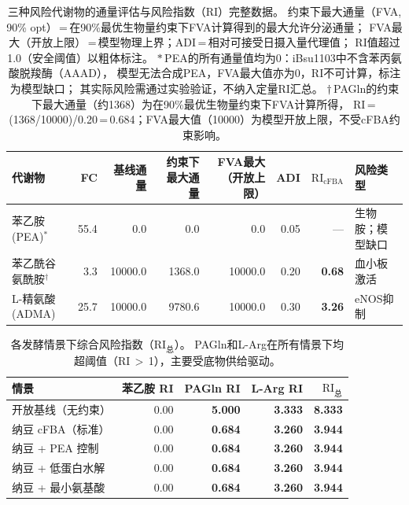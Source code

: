 \documentclass[10pt, a4paper, twocolumn]{ctexart}
\begin{document}
\begin{table}[htbp]
\caption{三种风险代谢物的通量评估与风险指数（RI）完整数据。
  约束下最大通量（FVA, 90\% opt）\,=\,在90\%最优生物量约束下FVA计算得到的最大允许分泌通量；
  FVA最大（开放上限）\,=\,模型物理上界；ADI\,=\,相对可接受日摄入量代理值；
  RI值超过1.0（安全阈值）以粗体标注。
  $*$\,PEA的所有通量值均为0：iBsu1103中不含苯丙氨酸脱羧酶（AAAD），
  模型无法合成PEA，FVA最大值亦为0，RI不可计算，标注为模型缺口；
  其实际风险需通过实验验证，不纳入定量RI汇总。
  $\dagger$\,PAGln的约束下最大通量（约1368）为在90\%最优生物量约束下FVA计算所得，
  RI\,=\,(1368/10000)/0.20\,=\,0.684；FVA最大值（10000）为模型开放上限，不受cFBA约束影响。}
\label{tab:risk}
\small
\centering
\begin{tabular}{lrrrrrrl}
\toprule
\textbf{代谢物} & \textbf{FC} & \textbf{基线通量} & \textbf{约束下最大通量} & \textbf{FVA最大（开放上限）} & \textbf{ADI} & \textbf{$\mathrm{RI_{cFBA}}$} & \textbf{风险类型} \\
\midrule
苯乙胺 (PEA)$^*$    & 55.4 &    0.0 &      0.0 &     0.0 & 0.05 & —     & 生物胺；模型缺口 \\
苯乙酰谷氨酰胺$^\dagger$ &  3.3 & 10000.0 &   1368.0 & 10000.0 & 0.20 & \textbf{0.68} & 血小板激活 \\
L-精氨酸 (ADMA) & 25.7 & 10000.0 &   9780.6 & 10000.0 & 0.30 & \textbf{3.26} & eNOS抑制 \\
\bottomrule
\end{tabular}
\end{table}

\begin{table}[htbp]
\caption{各发酵情景下综合风险指数（$\mathrm{RI}_{\text{总}}$）。
  PAGln和L-Arg在所有情景下均超阈值（RI\,$>$\,1），主要受底物供给驱动。}
\label{tab:ri}
\small
\centering
\begin{tabular}{lrrrr}
\toprule
\textbf{情景} & \textbf{苯乙胺 RI} & \textbf{PAGln RI} & \textbf{L-Arg RI} & \textbf{$\mathrm{RI}_{\text{总}}$} \\
\midrule
开放基线（无约束）   & 0.00 & \textbf{5.000} & \textbf{3.333} & \textbf{8.333} \\
纳豆 cFBA（标准）    & 0.00 & \textbf{0.684} & \textbf{3.260} & \textbf{3.944} \\
纳豆 + PEA 控制      & 0.00 & \textbf{0.684} & \textbf{3.260} & \textbf{3.944} \\
纳豆 + 低蛋白水解    & 0.00 & \textbf{0.684} & \textbf{3.260} & \textbf{3.944} \\
纳豆 + 最小氨基酸    & 0.00 & \textbf{0.684} & \textbf{3.260} & \textbf{3.944} \\
\bottomrule
\end{tabular}
\end{table}
\end{document}
